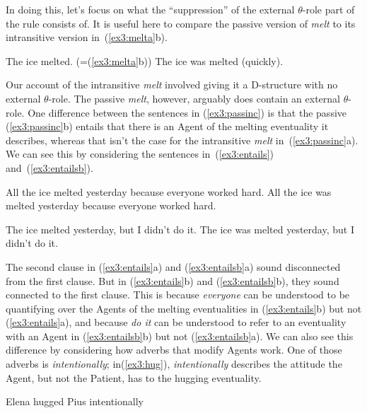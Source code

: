 In doing this, let's focus on what the ``suppression'' of the external $\theta$-role part of the rule consists of. It is useful here to compare the passive version of \emph{melt} to its intransitive version in~(\ref{ex3:melta}b).
\begin{exe}
	\raggedright
	\ex \label{ex3:passinc} 
	\begin{xlist}
		\ex The ice melted. (=(\ref{ex3:melta}b))
		\ex The ice was melted (quickly).
	\end{xlist}
\end{exe}
Our account of the intransitive \emph{melt} involved giving it a D-structure with no external $\theta$-role. The passive \emph{melt}, however, arguably does contain an external $\theta$-role. One difference between the sentences in (\ref{ex3:passinc}) is that the passive (\ref{ex3:passinc}b) entails that there is an Agent of the melting eventuality it describes, whereas that isn't the case for the intransitive \emph{melt} in~(\ref{ex3:passinc}a). We can see this by considering the sentences in~(\ref{ex3:entails}) and~(\ref{ex3:entailsb}).
\begin{exe}
	\raggedright
	\ex \label{ex3:entails} 
	\begin{xlist}
		\ex All the ice melted yesterday because everyone worked hard.
		\ex All the ice was melted yesterday because everyone worked hard.
	\end{xlist}
	\ex \label{ex3:entailsb}
	\begin{xlist}
		\ex The ice melted yesterday, but I didn't do it.
		\ex The ice was melted yesterday, but I didn't do it.
	\end{xlist}
\end{exe}
The second clause in (\ref{ex3:entails}a) and (\ref{ex3:entailsb}a) sound disconnected from the first clause. But in (\ref{ex3:entails}b) and (\ref{ex3:entailsb}b), they sound connected to the first clause. This is because \emph{everyone} can be understood to be quantifying over the Agents of the melting eventualities in (\ref{ex3:entails}b) but not (\ref{ex3:entails}a), and because \emph{do it} can be understood to refer to an eventuality with an Agent in (\ref{ex3:entailsb}b) but not (\ref{ex3:entailsb}a). We can also see this difference by considering how adverbs that modify Agents work. One of those adverbs is \emph{intentionally}; in(\ref{ex3:hug}), \emph{intentionally} describes the attitude the Agent, but not the Patient, has to the hugging eventuality.
\begin{exe}
	\raggedright
	\ex \label{ex3:hug} 
	Elena hugged Pius intentionally
\end{exe}
